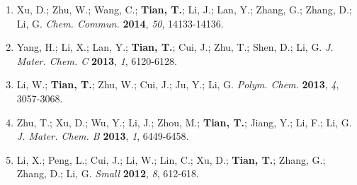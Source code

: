 \documentclass[margin]{res}
\begin{document}
\begin{resume}
\begin{enumerate}
  \item Xu, D.; Zhu, W.; Wang, C.; \textbf{Tian, T.}; Li, J.; Lan, Y.; Zhang, G.; Zhang, D.; Li, G. \textit{Chem. Commun.} \textbf{2014}, \textit{50}, 14133-14136.
  \item Yang, H.; Li, X.; Lan, Y.; \textbf{Tian, T.}; Cui, J.; Zhu, T.; Shen, D.; Li, G. \textit{J. Mater. Chem. C} \textbf{2013}, \textit{1}, 6120-6128.
  \item Li, W.; \textbf{Tian, T.}; Zhu, W.; Cui, J.; Ju, Y.; Li, G. \textit{Polym. Chem.} \textbf{2013}, \textit{4}, 3057-3068.
  \item Zhu, T.; Xu, D.; Wu, Y.; Li, J.; Zhou, M.; \textbf{Tian, T.}; Jiang, Y.; Li, F.; Li, G. \textit{J. Mater. Chem. B} \textbf{2013}, \textit{1}, 6449-6458.
  \item Li, X.; Peng, L.; Cui, J.; Li, W.; Lin, C.; Xu, D.; \textbf{Tian, T.}; Zhang, G.; Zhang, D.; Li, G. \textit{Small} \textbf{2012}, \textit{8}, 612-618.


\end{enumerate}



\end{resume}
\end{document}
